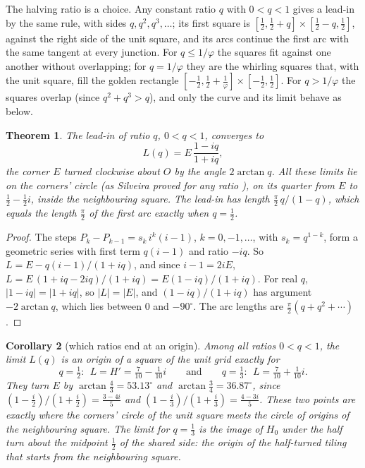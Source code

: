\documentclass[11pt,a4paper]{article}
\theoremstyle{plain}
\newtheorem{theorem}{Theorem}
\newtheorem{corollary}[theorem]{Corollary}
\theoremstyle{definition}
\theoremstyle{remark}
\begin{document}
The halving ratio is a choice. Any constant ratio $q$ with $0<q<1$ gives a lead-in by the same rule, with sides $q,q^2,q^3,\dots$; its first square is $[\tfrac12,\tfrac12+q]\times[\tfrac12-q,\tfrac12]$, against the right side of the unit square, and its arcs continue the first arc with the same tangent at every junction. For $q\le1/\varphi$ the squares fit against one another without overlapping; for $q=1/\varphi$ they are the whirling squares that, with the unit square, fill the golden rectangle $[-\tfrac12,\tfrac12+\tfrac1\varphi]\times[-\tfrac12,\tfrac12]$. For $q>1/\varphi$ the squares overlap (since $q^2+q^3>q$), and only the curve and its limit behave as below.

\begin{theorem}\label{thm:ratios}
The lead-in of ratio $q$, $0<q<1$, converges to
\[
  L(q)=E\,\frac{1-iq}{1+iq},
\]
the corner $E$ turned clockwise about $O$ by the angle $2\arctan q$. All these limits lie on the corners' circle (as Silveira proved for any ratio \cite[Cor.~2.7]{silveira}), on its quarter from $E$ to $\tfrac12-\tfrac12i$, inside the neighbouring square. The lead-in has length $\tfrac\pi2\,q/(1-q)$, which equals the length $\tfrac\pi2$ of the first arc exactly when $q=\tfrac12$.
\end{theorem}

\begin{proof}
The steps $P_k-P_{k-1}=s_k\,i^k(i-1)$, $k=0,-1,\dots$, with $s_k=q^{1-k}$, form a geometric series with first term $q(i-1)$ and ratio $-iq$. So $L=E-q(i-1)/(1+iq)$, and since $i-1=2iE$, $L=E\,(1+iq-2iq)/(1+iq)=E(1-iq)/(1+iq)$. For real $q$, $|1-iq|=|1+iq|$, so $|L|=|E|$, and $(1-iq)/(1+iq)$ has argument $-2\arctan q$, which lies between $0$ and $-90^\circ$. The arc lengths are $\tfrac\pi2(q+q^2+\cdots)$.
\end{proof}

\begin{corollary}[which ratios end at an origin]\label{cor:origins}
Among all ratios $0<q<1$, the limit $L(q)$ is an origin of a square of the unit grid exactly for
\[
  q=\tfrac12:\ \ L=H'=\tfrac7{10}-\tfrac1{10}i \qquad\text{and}\qquad q=\tfrac13:\ \ L=\tfrac7{10}+\tfrac1{10}i .
\]
They turn $E$ by $\arctan\tfrac43=53.13^\circ$ and $\arctan\tfrac34=36.87^\circ$, since $(1-\tfrac i2)/(1+\tfrac i2)=\tfrac{3-4i}5$ and $(1-\tfrac i3)/(1+\tfrac i3)=\tfrac{4-3i}5$. These two points are exactly where the corners' circle of the unit square meets the circle of origins of the neighbouring square. The limit for $q=\tfrac13$ is the image of $H_0$ under the half turn about the midpoint $\tfrac12$ of the shared side: the origin of the half-turned tiling that starts from the neighbouring square.
\end{corollary}
\end{document}
